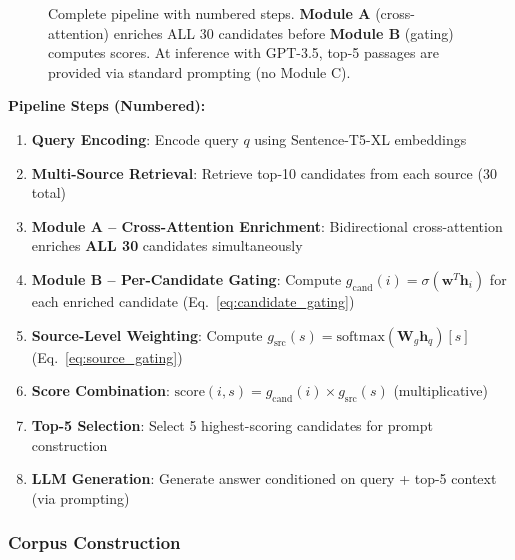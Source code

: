 \documentclass[10pt,twocolumn]{article}
\begin{document}
\begin{figure}[t]
\caption{Complete pipeline with numbered steps. \textbf{Module A} (cross-attention) enriches ALL 30 candidates before \textbf{Module B} (gating) computes scores. At inference with GPT-3.5, top-5 passages are provided via standard prompting (no Module C).}
\label{fig:pipeline}
\end{figure}

\textbf{Pipeline Steps (Numbered):}
\begin{enumerate}
    \item \textbf{Query Encoding}: Encode query $q$ using Sentence-T5-XL embeddings
    \item \textbf{Multi-Source Retrieval}: Retrieve top-10 candidates from each source (30 total)
    \item \textbf{Module A -- Cross-Attention Enrichment}: Bidirectional cross-attention enriches \textbf{ALL 30} candidates simultaneously
    \item \textbf{Module B -- Per-Candidate Gating}: Compute $g_{\text{cand}}(i) = \sigma(\mathbf{w}^T \mathbf{h}_i)$ for each enriched candidate (Eq.~\ref{eq:candidate_gating})
    \item \textbf{Source-Level Weighting}: Compute $g_{\text{src}}(s) = \text{softmax}(\mathbf{W}_g \mathbf{h}_q)[s]$ (Eq.~\ref{eq:source_gating})
    \item \textbf{Score Combination}: $\text{score}(i,s) = g_{\text{cand}}(i) \times g_{\text{src}}(s)$ (multiplicative)
    \item \textbf{Top-5 Selection}: Select 5 highest-scoring candidates for prompt construction
    \item \textbf{LLM Generation}: Generate answer conditioned on query + top-5 context (via prompting)
\end{enumerate}


\subsubsection{Corpus Construction}
\label{sec:corpus}
\end{document}
